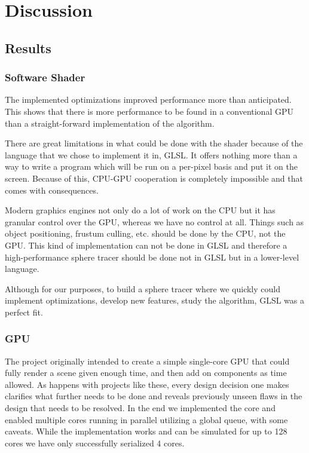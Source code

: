 \chapter{Discussion}
	
	\section{Results}
		
		\subsection{Software Shader}
		
			The implemented optimizations improved performance more than anticipated.
			This shows that there is more performance to be found in a conventional
			GPU than a straight-forward implementation of the algorithm. 

			There are great limitations in what could be done with the shader because
			of the language that we chose to implement it in, GLSL. It offers nothing 
			more than a way to write a program which will be run on a per-pixel basis
			and put it on the screen. Because of this, CPU-GPU cooperation is completely
			impossible and that comes with consequences.

			Modern graphics engines not only do a lot of work on the
			CPU but it has granular control over the GPU, whereas we have no control
			at all. Things such as object positioning, frustum culling, etc. should be 
			done by the CPU, not the GPU. This kind of implementation can 
			not be done in GLSL and therefore a high-performance sphere tracer should be done not in 
			GLSL but in a lower-level language.

			Although for our purposes, to build a sphere tracer where we quickly could implement
			optimizations, develop new features, study the algorithm, GLSL was a
			perfect fit. 

		
		\subsection{GPU} 
		
			The project originally intended to create a simple single-core GPU
			that could fully render a scene given enough time, and then add on
			components as time allowed. As happens with projects like these,
			every design decision one makes clarifies what further needs to be
			done and reveals previously unseen flaws in the design that needs
			to be resolved. In the end we implemented the core and enabled
			multiple cores running in parallel utilizing a global queue, with
			some caveats. While the implementation works and can be simulated
			for up to 128 cores we have only successfully serialized 4 cores. 
			
